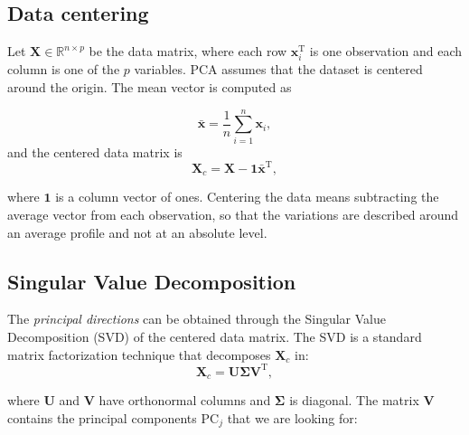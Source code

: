 \subsection{Data centering}
\label{subsec:pca_centering_covariance}

Let \(\mathbf{X} \in \mathbb{R}^{n \times p}\) be the data matrix, where each row \(\mathbf{x}_i^{\mathrm{T}}\) is one observation and each column is one of the \(p\) variables. PCA assumes that the dataset is centered around the origin. The mean vector is computed as

\begin{equation}
    \bar{\mathbf{x}} =
    \frac{1}{n}\sum_{i=1}^{n}\mathbf{x}_i,
    \label{eq:pca_mean_spectrum}
\end{equation}
 and the centered data matrix is
\begin{equation}
    \mathbf{X}_c =
    \mathbf{X} - \mathbf{1}\bar{\mathbf{x}}^{\mathrm{T}},
    \label{eq:pca_centered_matrix}
\end{equation}

where \(\mathbf{1}\) is a column vector of ones. Centering the data means subtracting the average vector from each observation, so that the variations are described around an average profile and not at an absolute level.

\subsection{Singular Value Decomposition}
\label{subsec:pca_svd}

The \textit{principal directions} can be obtained through the Singular Value Decomposition (SVD) \cite{brunton2019datadriven} of the centered data matrix. The SVD is a standard matrix factorization technique that decomposes \(\mathbf{X}_c\) in:
\begin{equation}
    \mathbf{X}_c =
    \mathbf{U}\boldsymbol{\Sigma}\mathbf{V}^{\mathrm{T}},
    \label{eq:pca_svd}
\end{equation}

where \(\mathbf{U}\) and \(\mathbf{V}\) have orthonormal columns and \(\boldsymbol{\Sigma}\) is diagonal. The matrix \(\mathbf{V}\) contains the principal components \(\mathrm{PC}_j\) that we are looking for:

